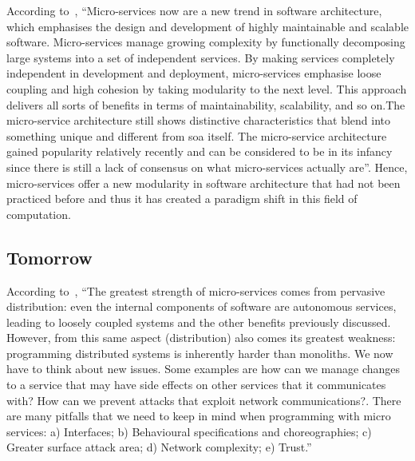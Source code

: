 According to~\cite{microservicesStateOfArt}, \enquote{Micro-services now are a new trend in software architecture, which emphasises the design and development of highly maintainable and scalable software. Micro-services manage growing complexity by functionally decomposing large systems into a set of independent services. By making services completely independent in development and deployment, micro-services emphasise loose coupling and high cohesion by taking modularity to the next level. This approach delivers all sorts of benefits in terms of maintainability, scalability, and so on.The micro-service architecture still shows distinctive characteristics that blend into something unique and different from \gls{soa} itself. The micro-service architecture gained popularity relatively recently and can be considered to be in its infancy since there is still a lack of consensus on what micro-services actually are}. Hence, micro-services offer a new modularity in software architecture that had not been practiced before and thus it has created a paradigm shift in this field of computation.

\subsection{Tomorrow}

According to~\cite{microservicesStateOfArt}, \enquote{The greatest strength of micro-services comes from pervasive distribution: even the internal components of software are autonomous services, leading to loosely coupled systems and the other benefits previously discussed. However, from this same aspect (distribution) also comes its greatest weakness: programming distributed systems is inherently harder than monoliths. We now have to think about new issues. Some examples are how can we manage changes to a service that may have side effects on other services that it communicates with? How can we prevent attacks that exploit network communications?. There are many pitfalls that we need to keep in mind when programming with micro services: a) Interfaces; b) Behavioural specifications and choreographies; c) Greater surface attack area; d) Network complexity; e) Trust.}
